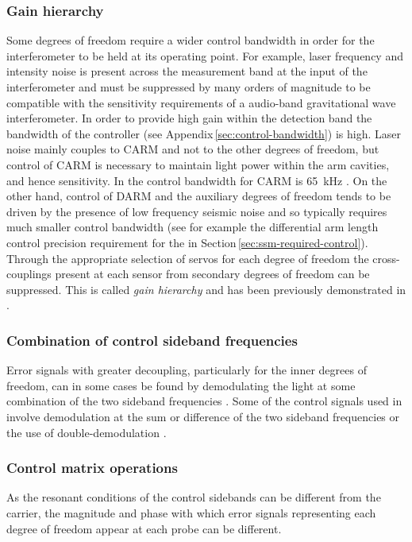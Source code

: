 \subsubsection{\label{sec:drfpmi-gain-hierarchy}Gain hierarchy}
Some degrees of freedom require a wider control bandwidth in order for the interferometer to be held at its operating point. For example, laser frequency and intensity noise is present across the measurement band at the input of the interferometer and must be suppressed by many orders of magnitude to be compatible with the sensitivity requirements of a audio-band gravitational wave interferometer. In order to provide high gain within the detection band the bandwidth of the controller (see Appendix\,\ref{sec:control-bandwidth}) is high. Laser noise mainly couples to \gls{CARM} and not to the other degrees of freedom, but control of \gls{CARM} is necessary to maintain light power within the arm cavities, and hence sensitivity. In \ALIGO{} the control bandwidth for \gls{CARM} is \SI{65}{\kilo\hertz} \cite{Abbott2010}. On the other hand, control of \gls{DARM} and the auxiliary degrees of freedom tends to be driven by the presence of low frequency seismic noise and so typically requires much smaller control bandwidth (see for example the differential arm length control precision requirement for the \SSMEXPT{} in Section\,\ref{sec:ssm-required-control}). Through the appropriate selection of servos for each degree of freedom the cross-couplings present at each sensor from secondary degrees of freedom can be suppressed. This is called \emph{gain hierarchy} and has been previously demonstrated in \LIGO{} \cite{Fritschel2001}.

\subsubsection{\label{sec:sideband-beats}Combination of control sideband frequencies}
Error signals with greater decoupling, particularly for the inner degrees of freedom, can in some cases be found by demodulating the light at some combination of the two sideband frequencies \cite{Strain2003, Barr2006}. Some of the control signals used in \ALIGO{} involve demodulation at the sum or difference of the two sideband frequencies \cite{Abbott2010} or the use of double-demodulation \cite{Staley2014}.

\subsubsection{\label{sec:control-matrix-operations}Control matrix operations}
As the resonant conditions of the control sidebands can be different from the carrier, the magnitude and phase with which error signals representing each degree of freedom appear at each probe can be different.

